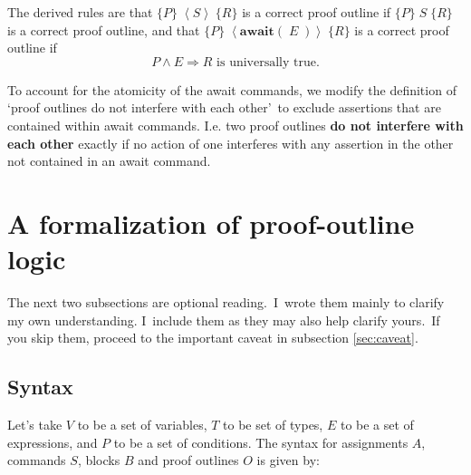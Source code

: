 \documentclass[11pt]{article}%
\begin{document}
The derived rules are that $\{P\}\;\left\langle S\right\rangle \;\{R\}$ is a
correct proof outline if $\{P\}\;S\;\{R\}$ is a correct proof outline, and
that $\{P\}\;\left\langle \mathbf{await}(\;E\;)\right\rangle \;\{R\}$ is a
correct proof outline if
\[
P\wedge E\Rightarrow R\text{ is universally true.}%
\]


To account for the atomicity of the await commands, we modify the definition
of `proof outlines do not interfere with each other'\ to exclude assertions
that are contained within await commands. I.e. two proof outlines \textbf{do
not interfere with each other} exactly if no action of one interferes with any
assertion in the other not contained in an await command.

\section{A formalization of proof-outline logic\label{formalization}}

The next two subsections are optional reading.\ I\ wrote them mainly to
clarify my own understanding. I\ include them as they may also help clarify
yours.\ If you skip them, proceed to the important caveat in subsection
\ref{sec:caveat}.

\subsection{Syntax}

Let's take $V$ to be a set of variables, $T$ to be set of types, $E$ to be a
set of expressions, and $P$ to be a set of conditions. The syntax for
assignments $A$, commands $S$, blocks $B$ and proof outlines $O$ is given by:%
\end{document}
